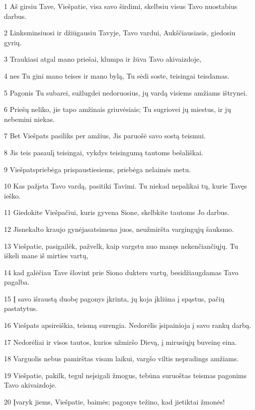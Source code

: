 \par 1 Aš girsiu Tave, Viešpatie, visa savo širdimi, skelbsiu visus Tavo nuostabius darbus. 
\par 2 Linksminsiuosi ir džiūgausiu Tavyje, Tavo vardui, Aukščiausiasis, giedosiu gyrių. 
\par 3 Traukiasi atgal mano priešai, klumpa ir žūva Tavo akivaizdoje, 
\par 4 nes Tu gini mano teises ir mano bylą, Tu sėdi soste, teisingai teisdamas. 
\par 5 Pagonis Tu subarei, sužlugdei nedoruosius, jų vardą visiems amžiams ištrynei. 
\par 6 Priešų neliko, jie tapo amžinais griuvėsiais; Tu sugriovei jų miestus, ir jų nebemini niekas. 
\par 7 Bet Viešpats pasiliks per amžius, Jis paruošė savo sostą teismui. 
\par 8 Jis teis pasaulį teisingai, vykdys teisingumą tautoms bešališkai. 
\par 9 Viešpats­priebėga prispaustiesiems, priebėga nelaimės metu. 
\par 10 Kas pažįsta Tavo vardą, pasitiki Tavimi. Tu niekad nepalikai tų, kurie Tavęs ieško. 
\par 11 Giedokite Viešpačiui, kuris gyvena Sione, skelbkite tautoms Jo darbus. 
\par 12 Jis­nekalto kraujo gynėjas­atsimena juos, neužmiršta vargingųjų šauksmo. 
\par 13 Viešpatie, pasigailėk, pažvelk, kaip vargstu nuo manęs nekenčiančiųjų. Tu iškeli mane iš mirties vartų, 
\par 14 kad galėčiau Tave šlovint prie Siono dukters vartų, besidžiaugdamas Tavo pagalba. 
\par 15 Į savo išraustą duobę pagonys įkrinta, jų koja įkliūna į spąstus, pačių pastatytus. 
\par 16 Viešpats apsireiškia, teismą surengia. Nedorėlis įsipainioja į savo rankų darbą. 
\par 17 Nedorėliai ir visos tautos, kurios užmiršo Dievą, į mirusiųjų buveinę eina. 
\par 18 Varguolis nebus pamirštas visam laikui, vargšo viltis nepradings amžiams. 
\par 19 Viešpatie, pakilk, tegul neįsigali žmogus, tebūna suruoštas teismas pagonims Tavo akivaizdoje. 
\par 20 Įvaryk jiems, Viešpatie, baimės; pagonys težino, kad jie­tiktai žmonės!



